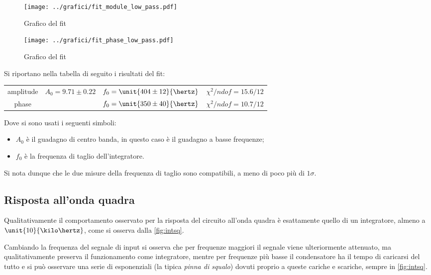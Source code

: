 \documentclass[10pt,a4paper]{article}
\begin{document}
\begin{figure}[h!]
\centering
	\begin{minipage}[h!]{0.48\textwidth}
		\centering
		\texttt{[image: ../grafici/fit\_module\_low\_pass.pdf]}
		\caption{Grafico del fit }
		\label{fig:lowamp}
	\end{minipage}
	\begin{minipage}[h!]{0.48\textwidth}
		\centering
		\texttt{[image: ../grafici/fit\_phase\_low\_pass.pdf]}
		\caption{Grafico del fit }
		\label{fig:lowph}
	\end{minipage}
\end{figure}

Si riportano nella tabella di seguito i risultati del fit:

\begin{table}[h!]
\centering
\begin{tabular}{c|ccc}
amplitude	&	$A_0 = 9.71 \pm 0.22$	&	$f_0 = \unit{404 \pm 12}{\hertz}$	&	$\chi^2/ndof = 15.6 / 12$\\
phase		& &	$f_0 = \unit{350 \pm 40}{\hertz}$	&	$\chi^2/ndof = 10.7 / 12$
\end{tabular}
\end{table}

\noindent Dove si sono usati i seguenti simboli:
\begin{itemize}
\item $A_0$ è il guadagno di centro banda, in questo caso è il guadagno a basse frequenze;
\item $f_0$ è la frequenza di taglio dell'integratore.
\end{itemize}

Si nota dunque che le due misure della frequenza di taglio sono compatibili, a meno di poco più di $1\sigma$.

\subsection{Risposta all'onda quadra}

Qualitativamente il comportamento osservato per la risposta del circuito all'onda quadra è esattamente quello di un integratore, almeno a $\unit{10}{\kilo\hertz}$, come si osserva dalla \figurename{\ref{fig:intsq}}.

Cambiando la frequenza del segnale di input si osserva che per frequenze maggiori il segnale viene ulteriormente attenuato, ma qualitativamente preserva il funzionamento come integratore, mentre per frequenze più basse il condensatore ha il tempo di caricarsi del tutto e si può osservare una serie di esponenziali (la tipica \emph{pinna di squalo}) dovuti proprio a queste cariche e scariche, sempre in \figurename{\ref{fig:intsq}}.
\end{document}
